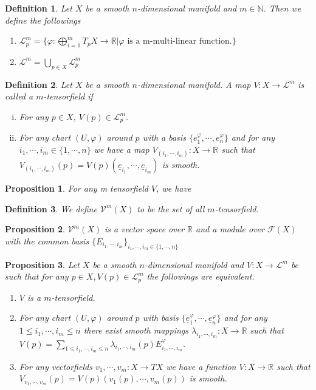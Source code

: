 \documentclass{article}
\newtheorem{proposition}{Proposition}[section]
\newtheorem{definition}{Definition}[section]
\numberwithin{equation}{section}
\begin{document}
\begin{definition}
Let $X$ be a smooth $n$-dimensional manifold and $m\in\mathbb{N}$. Then we define the followings
\begin{enumerate}
\item $\mathcal{L}^m_p=\{\varphi:\bigoplus_{i=1}^mT_pX\to\mathbb{R}|\varphi \text{ is a m-multi-linear function.}\}$
\item $\mathcal{L}^m=\bigcup_{p\in X}\mathcal{L}^m_p$
\end{enumerate}
\end{definition}

\begin{definition}
Let $X$ be a smooth $n$-dimensional manifold. A map $V:X\to\mathcal{L}^m$ is called a $m$-tensorfield if 
\begin{enumerate}[i.]
\item For any $p\in X$, $V(p)\in\mathcal{L}^m_p$.
\item For any chart $(U,\varphi)$ around $p$ with a basis $\{e_1^\varphi,\cdots,e_n^\varphi\}$ and for any $i_1,\cdots,i_m\in\{1,\cdots,n\}$ we have a map $V_{(i_1,\cdots,i_m)}:X\to\mathbb{R}$ such that $V_{(i_1,\cdots,i_m)}(p)=V(p)(\underline{e}_{i_1},\cdots,\underline{e}_{i_m})$ is smooth.
\end{enumerate}
\end{definition}

\begin{proposition}
For any m tensorfield $V$, we have
\end{proposition}

\begin{definition}
We define $\mathcal{V}^m(X)$ to be the set of all $m$-tensorfield.
\end{definition}

\begin{proposition}
$\mathcal{V}^m(X)$ is a vector space over $\mathbb{R}$ and a module over $\mathcal{F}(X)$ with the common basis $\{E_{i_1,\cdots,i_m}\}_{i_1,\cdots,i_m\in\{1,\cdots,n\}}$
\end{proposition}

\begin{proposition}
Let $X$ be a smooth $n$-dimensional manifold and $V:X\to\mathcal{L}^m$ be such that for any $p\in X, V(p)\in\mathcal{L}_p^m$ the followings are equivalent.
\begin{enumerate}
\item $V$ is a $m$-tensorfield.
\item For any chart $(U,\varphi)$ around $p$ with basis $\{\underline{e}_1^\varphi,\cdots,\underline{e}_n^\varphi\}$ and for any $1\leq i_1,\cdots,i_m\leq n$ there exist smooth mappings $\lambda_{i_1,\cdots,i_m}:X\to\mathbb{R}$ such that $V(p)=\sum_{1\leq i_1,\cdots,i_m\leq n} \lambda_{i_1,\cdots,i_m}(p)E_{i_1,\cdots,i_m}^\varphi$. 
\item For any vectorfields $v_1,\cdots,v_m:X\to TX$ we have a function $V:X\to\mathbb{R}$ such that $V_{v_1,\cdots,v_m}(p)=V(p)(v_1(p),\cdots,v_m(p))$ is smooth.
\end{enumerate}
\end{proposition}
\end{document}
